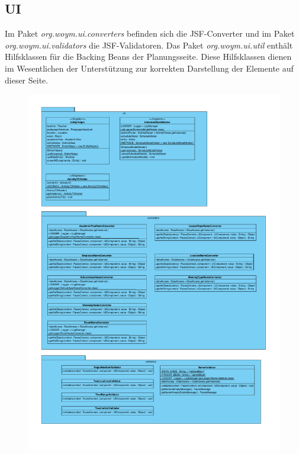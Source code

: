 \documentclass[fontsize=12pt,paper=a4,twoside]{scrartcl}
\begin{document}


\subsection{UI}
\label{subsec:UI}

Im Paket \textit{org.woym.ui.converters} befinden sich die JSF-Converter und im Paket \textit{org.woym.ui.validators} die JSF-Validatoren. Das Paket \textit{org.woym.ui.util} enthält Hilfsklassen für die Backing Beans der Planungsseite. Diese Hilfsklassen dienen im Wesentlichen der Unterstützung zur korrekten Darstellung der Elemente auf dieser Seite.\clearpage

\begin{figure}[H]
\centering
\includegraphics[width=\textwidth]{ui.pdf}
\end{figure}
\end{document}

